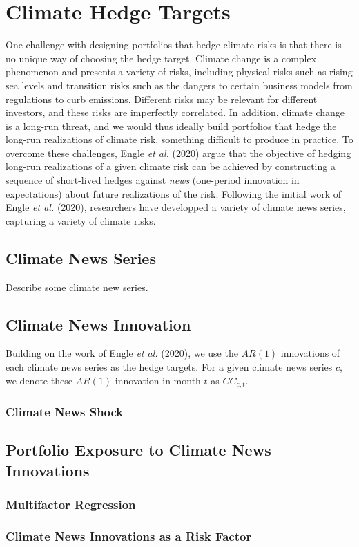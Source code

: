\chapter{Climate Hedge Targets}

One challenge with designing portfolios 
that hedge climate risks is that there is no unique way of choosing the hedge target.
Climate change is a complex phenomenon and presents
a variety of risks, including physical risks such as rising sea levels and transition risks such
as the dangers to certain business models from regulations to curb emissions. 
Different risks may be relevant for different investors, 
and these risks are imperfectly correlated. In
addition, climate change is a long-run threat, 
and we would thus ideally build portfolios that
hedge the long-run realizations of climate risk, 
something difficult to produce in practice.
To overcome these challenges, 
Engle \textit{et al.} (2020) \cite{engle2020hedging} argue that 
the objective of hedging long-run realizations of a given climate risk
can be achieved by constructing a sequence of short-lived hedges against 
\textit{news} (one-period innovation in expectations) about future 
realizations of the risk. Following the initial work of Engle \textit{et al.} (2020),
researchers have developped a variety of climate news series, capturing 
a variety of climate risks. 

\section{Climate News Series}

Describe some climate new series.

\section{Climate News Innovation}

Building on the work of Engle \textit{et al.} (2020), 
we use the $AR(1)$ innovations of each climate news series as the hedge targets.
For a given climate news series $c$, we denote these $AR(1)$ innovation 
in month $t$ as $CC_{c,t}$.

\subsection{Climate News Shock}

\section{Portfolio Exposure to Climate News Innovations}

\subsection{Multifactor Regression}

\subsection{Climate News Innovations as a Risk Factor}
